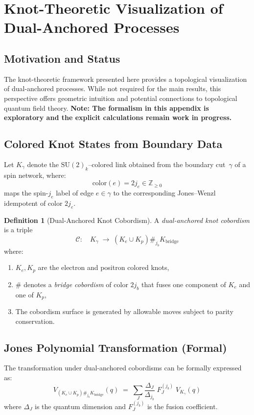 \documentclass[11pt]{article}
\theoremstyle{plain}
\theoremstyle{definition}
\newtheorem{definition}[theorem]{Definition}
\begin{document}
\appendix

\section{Knot-Theoretic Visualization of Dual-Anchored Processes}
\label{app:knot-unified}

\subsection{Motivation and Status}
The knot-theoretic framework presented here provides a topological visualization of dual-anchored processes. While not required for the main results, this perspective offers geometric intuition and potential connections to topological quantum field theory. \textbf{Note: The formalism in this appendix is exploratory and the explicit calculations remain work in progress.}

\subsection{Colored Knot States from Boundary Data}
Let $K_\gamma$ denote the $\mathrm{SU}(2)_k$--colored link obtained from the boundary cut~$\gamma$ of a spin network, where:
\[
  \mathrm{color}(e) = 2 j_e \in \mathbb{Z}_{\geq 0}
\]
maps the spin-$j_e$ label of edge $e \in \gamma$ to the corresponding Jones--Wenzl idempotent of color $2j_e$.

\begin{definition}[Dual-Anchored Knot Cobordism]
  A \emph{dual-anchored knot cobordism} is a triple
  \[
    \mathcal{C}:\quad K_\gamma \;\longrightarrow\; (K_e \cup K_p) \#_{j_b} K_{\mathrm{bridge}}
  \]
  where:
  \begin{enumerate}
    \item $K_e, K_p$ are the electron and positron colored knots,
    \item $\#$ denotes a \emph{bridge cobordism} of color $2j_b$ that fuses one component of $K_e$ and one of $K_p$,
    \item The cobordism surface is generated by allowable moves subject to parity conservation.
  \end{enumerate}
\end{definition}

\subsection{Jones Polynomial Transformation (Formal)}
The transformation under dual-anchored cobordisms can be formally expressed as:
\begin{equation}
  V_{(K_e \cup K_p) \#_{j_b} K_{\mathrm{bridge}}}(q)
  \;=\;
  \sum_{J}
  \frac{\Delta_J}{\Delta_{j_b}} \;
  F^{(j_b)}_{J} \;
  V_{K_\gamma}(q)
\end{equation}
where $\Delta_J$ is the quantum dimension and $F^{(j_b)}_J$ is the fusion coefficient.
\end{document}
